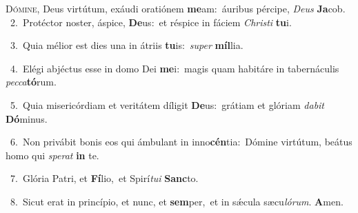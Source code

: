 \lettrine{\initial\textcolor{\initialcolor}{D}}{ómine,} Deus virtútum, exáudi oratiónem \textbf{me}\-am:~\star áuribus pércipe, \textit{De}\-\textit{us} \textbf{Ja}\-cob.\\
{\numbfont\textcolor{\numbcolor}{~2.}}~Protéctor noster, áspice, \textbf{De}\-us:~\star et réspice in fáciem \textit{Chris}\-\textit{ti} \textbf{tu}\-i.\par
{\numbfont\textcolor{\numbcolor}{~3.}}~Quia mélior est dies una in átriis \textbf{tu}\-is:~\star \textit{su}\-\textit{per} \textbf{míl}\-lia.\par
{\numbfont\textcolor{\numbcolor}{~4.}}~Elégi abjéctus esse in domo Dei \textbf{me}\-i:~\star magis quam habitáre in tabernáculis \textit{pec}\-\textit{ca}\textbf{tó}rum.\par
{\numbfont\textcolor{\numbcolor}{~5.}}~Quia misericórdiam et veritátem díligit \textbf{De}\-us:~\star grátiam et glóriam \textit{da}\-\textit{bit} \textbf{Dó}\-minus.\par
{\numbfont\textcolor{\numbcolor}{~6.}}~Non privábit bonis eos qui ámbulant in inno\-\textbf{cén}\-tia:~\star Dómine virtútum, beátus homo qui \textit{spe}\-\textit{rat} \textbf{in} te.\par
{\numbfont\textcolor{\numbcolor}{~7.}}~Glória Patri, et \textbf{Fí}\-lio,~\star et Spirí\-\textit{tu}\-\textit{i} \textbf{Sanc}\-to.\par
{\numbfont\textcolor{\numbcolor}{~8.}}~Sicut erat in princípio, et nunc, et \textbf{sem}\-per,~\star et in sǽcula sæcu\-\textit{ló}\-\textit{rum}. \textbf{A}\-men.\par
